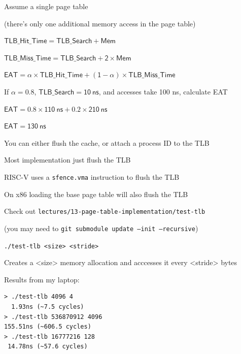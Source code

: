 \begin{slide}


    Assume a single page table
    
    \leftspace{}(there's only one additional memory access in the page table)
    \medskip

    $\mathsf{TLB\_Hit\_Time = TLB\_Search + Mem}$

    $\mathsf{TLB\_Miss\_Time = TLB\_Search + 2 \times Mem}$

    $\mathsf{EAT = \alpha \times TLB\_Hit\_Time + (1 - \alpha) \times TLB\_Miss\_Time}$
    \medskip

    If $\mathsf{\alpha = 0.8}$, $\mathsf{TLB\_Search = 10\ ns}$, and accesses take 100 ns, calculate EAT

    \leftspace{}$\mathsf{EAT = 0.8 \times 110\ ns + 0.2 \times 210\ ns}$

    \leftspace{}$\mathsf{EAT = 130\ ns}$

\end{slide}

\begin{slide}


    You can either flush the cache, or attach a process ID to the TLB
    \medskip

    Most implementation just flush the TLB

    \leftspace{}RISC-V uses a \texttt{sfence.vma} instruction to flush the TLB
    \medskip

    On x86 loading the base page table will also flush the TLB

\end{slide}

\begin{slide}


    Check out \texttt{lectures/13-page-table-implementation/test-tlb}

    \leftspace{}(you may need to \texttt{git submodule update --init --recursive})
    \medskip

    \texttt{./test-tlb <size> <stride>}

    \leftspace{}Creates a <size> memory allocation and acccesses it every <stride> bytes
    \medskip

    Results from my laptop:
    \begin{verbatim}
> ./test-tlb 4096 4        
  1.93ns (~7.5 cycles)
> ./test-tlb 536870912 4096
155.51ns (~606.5 cycles)
> ./test-tlb 16777216 128  
 14.78ns (~57.6 cycles)
    \end{verbatim}

\end{slide}

